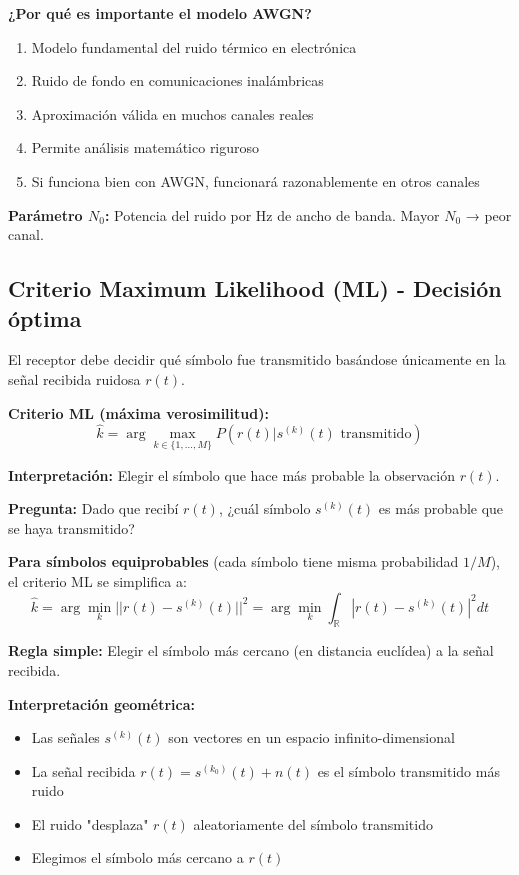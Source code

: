 \documentclass[10pt,a4paper]{article}
\begin{document}
\textbf{¿Por qué es importante el modelo AWGN?}
\begin{enumerate}
\item Modelo fundamental del ruido térmico en electrónica
\item Ruido de fondo en comunicaciones inalámbricas
\item Aproximación válida en muchos canales reales
\item Permite análisis matemático riguroso
\item Si funciona bien con AWGN, funcionará razonablemente en otros canales
\end{enumerate}

\textbf{Parámetro $N_0$:} Potencia del ruido por Hz de ancho de banda. Mayor $N_0$ → peor canal.

\subsection{Criterio Maximum Likelihood (ML) - Decisión óptima}

El receptor debe decidir qué símbolo fue transmitido basándose únicamente en la señal recibida ruidosa $r(t)$.

\textbf{Criterio ML (máxima verosimilitud):}
$$\hat{k} = \arg\max_{k \in \{1,\ldots,M\}} P(r(t)|s^{(k)}(t) \text{ transmitido})$$

\textbf{Interpretación:} Elegir el símbolo que hace más probable la observación $r(t)$.

\textbf{Pregunta:} Dado que recibí $r(t)$, ¿cuál símbolo $s^{(k)}(t)$ es más probable que se haya transmitido?

\textbf{Para símbolos equiprobables} (cada símbolo tiene misma probabilidad $1/M$), el criterio ML se simplifica a:
$$\hat{k} = \arg\min_{k} ||r(t) - s^{(k)}(t)||^2 = \arg\min_{k} \int_{\mathbb{R}} |r(t) - s^{(k)}(t)|^2 dt$$

\textbf{Regla simple:} Elegir el símbolo más cercano (en distancia euclídea) a la señal recibida.

\textbf{Interpretación geométrica:}
\begin{itemize}
\item Las señales $s^{(k)}(t)$ son vectores en un espacio infinito-dimensional
\item La señal recibida $r(t) = s^{(k_0)}(t) + n(t)$ es el símbolo transmitido más ruido
\item El ruido "desplaza" $r(t)$ aleatoriamente del símbolo transmitido
\item Elegimos el símbolo más cercano a $r(t)$
\end{itemize}
\end{document}

